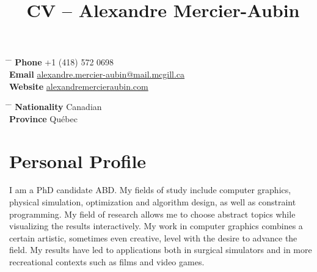 \documentclass[10pt]{article} %
\begin{document}

\title{CV -- Alexandre Mercier-Aubin} %


\parbox{0.5\textwidth}{ %
\begin{tabbing} %
\hspace{3cm} \= \hspace{4cm} \= \kill %
{\bf Phone} \> +1 (418) 572 0698 \\ %
{\bf Email} \> \href{mailto:alexandre.mercier-aubin@mail.mcgill.ca}{alexandre.mercier-aubin@mail.mcgill.ca} \\ %
{\bf Website} \> \href{https://alexandremercieraubin.com}{alexandremercieraubin.com} \\
\end{tabbing}}
\hfill %
\parbox{0.5\textwidth}{ %
\begin{tabbing} %
\hspace{3cm} \= \hspace{4cm} \= \kill %
{\bf Nationality} \> Canadian \\ %
{\bf Province} \> {Québec}\\
\end{tabbing}}

\vspace{-0.7cm} 

\justifying


\section{Personal Profile}

I am a PhD candidate ABD. My fields of study include computer graphics, physical simulation, optimization and algorithm design, as well as constraint programming. My field of research allows me to choose abstract topics while visualizing the results interactively. My work in computer graphics combines a certain artistic, sometimes even creative, level with the desire to advance the field. My results have led to applications both in surgical simulators and in more recreational contexts such as films and video games.
\end{document}
